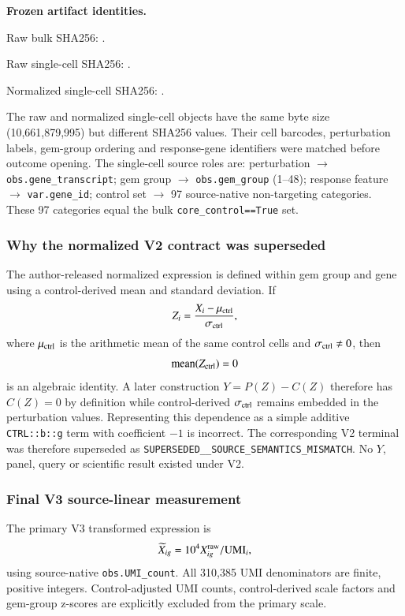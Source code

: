 \documentclass[11pt]{article}
\begin{document}
\noindent\textbf{Frozen artifact identities.}\par
\begingroup\small
\setlength{\parindent}{0pt}\setlength{\parskip}{2pt}
Raw bulk SHA256: \texttt{}.\par
Raw single-cell SHA256: \texttt{}.\par
Normalized single-cell SHA256: \texttt{}.
\endgroup

The raw and normalized single-cell objects have the same byte size (10,661,879,995) but different SHA256 values. Their cell barcodes, perturbation labels, gem-group ordering and response-gene identifiers were matched before outcome opening. The single-cell source roles are: perturbation $\rightarrow$ \texttt{obs.gene\_transcript}; gem group $\rightarrow$ \texttt{obs.gem\_group} (1--48); response feature $\rightarrow$ \texttt{var.gene\_id}; control set $\rightarrow$ 97 source-native non-targeting categories. These 97 categories equal the bulk \texttt{core\_control==True} set.

\subsubsection{Why the normalized V2 contract was superseded}
The author-released normalized expression is defined within gem group and gene using a control-derived mean and standard deviation. If
\[
Z_i=\frac{X_i-\mu_{\rm ctrl}}{\sigma_{\rm ctrl}},
\]
where $\mu_{\rm ctrl}$ is the arithmetic mean of the same control cells and $\sigma_{\rm ctrl}\ne0$, then
\[
\operatorname{mean}(Z_{\rm ctrl})=0
\]
is an algebraic identity. A later construction $Y=P(Z)-C(Z)$ therefore has $C(Z)=0$ by definition while control-derived $\sigma_{\rm ctrl}$ remains embedded in the perturbation values. Representing this dependence as a simple additive \texttt{CTRL::b::g} term with coefficient $-1$ is incorrect. The corresponding V2 terminal was therefore superseded as \texttt{SUPERSEDED\_\_SOURCE\_SEMANTICS\_MISMATCH}. No $Y$, panel, query or scientific result existed under V2.

\subsubsection{Final V3 source-linear measurement}
The primary V3 transformed expression is
\[
\widetilde X_{ig}=10^4 X^{\rm raw}_{ig}/\mathrm{UMI}_i,
\]
using source-native \texttt{obs.UMI\_count}. All 310,385 UMI denominators are finite, positive integers. Control-adjusted UMI counts, control-derived scale factors and gem-group z-scores are explicitly excluded from the primary scale.
\end{document}
